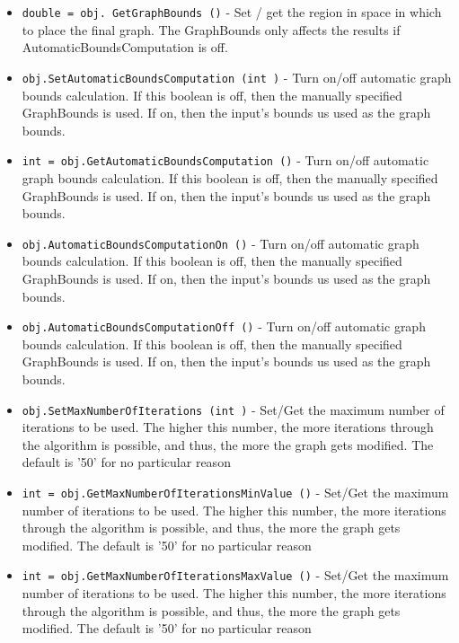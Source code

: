 \begin{itemize}
\item  \verb|double = obj. GetGraphBounds ()| -  Set / get the region in space in which to place the final graph.
 The GraphBounds only affects the results if AutomaticBoundsComputation
 is off.

\item  \verb|obj.SetAutomaticBoundsComputation (int )| -  Turn on/off automatic graph bounds calculation. If this
 boolean is off, then the manually specified GraphBounds is used.
 If on, then the input's bounds us used as the graph bounds.

\item  \verb|int = obj.GetAutomaticBoundsComputation ()| -  Turn on/off automatic graph bounds calculation. If this
 boolean is off, then the manually specified GraphBounds is used.
 If on, then the input's bounds us used as the graph bounds.

\item  \verb|obj.AutomaticBoundsComputationOn ()| -  Turn on/off automatic graph bounds calculation. If this
 boolean is off, then the manually specified GraphBounds is used.
 If on, then the input's bounds us used as the graph bounds.

\item  \verb|obj.AutomaticBoundsComputationOff ()| -  Turn on/off automatic graph bounds calculation. If this
 boolean is off, then the manually specified GraphBounds is used.
 If on, then the input's bounds us used as the graph bounds.

\item  \verb|obj.SetMaxNumberOfIterations (int )| -  Set/Get the maximum number of iterations to be used.
 The higher this number, the more iterations through the algorithm
 is possible, and thus, the more the graph gets modified.
 The default is '50' for no particular reason

\item  \verb|int = obj.GetMaxNumberOfIterationsMinValue ()| -  Set/Get the maximum number of iterations to be used.
 The higher this number, the more iterations through the algorithm
 is possible, and thus, the more the graph gets modified.
 The default is '50' for no particular reason

\item  \verb|int = obj.GetMaxNumberOfIterationsMaxValue ()| -  Set/Get the maximum number of iterations to be used.
 The higher this number, the more iterations through the algorithm
 is possible, and thus, the more the graph gets modified.
 The default is '50' for no particular reason


\end{itemize}
